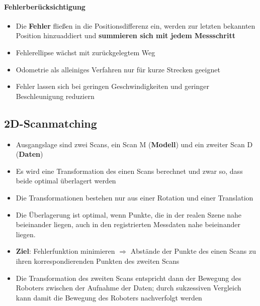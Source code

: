 \paragraph{Fehlerberücksichtigung}
\begin{itemize}
	\item Die \textbf{Fehler} fließen in die Positionsdifferenz ein, werden zur
		letzten bekannten Position hinzuaddiert und \textbf{summieren sich mit
		jedem Messschritt}
	\item Fehlerellipse wächst mit zurückgelegtem Weg
	\item Odometrie als alleiniges Verfahren nur für kurze Strecken geeignet
	\item Fehler lassen sich bei geringen Geschwindigkeiten und geringer
		Beschleunigung reduziern
\end{itemize}

\subsection{2D-Scanmatching}
\begin{itemize}
	\item Ausgangslage sind zwei Scans, ein Scan M (\textbf{Modell}) und ein
		zweiter Scan D (\textbf{Daten})
	\item Es wird eine Transformation des einen Scans berechnet und zwar so,
		dass beide optimal überlagert werden
	\item Die Transformationen bestehen nur aus einer Rotation und einer
		Translation
	\item Die Überlagerung ist optimal, wenn Punkte, die in der realen Szene
		nahe beieinander liegen, auch in den registrierten Messdaten nahe
		beieinander liegen.
	\item \textbf{Ziel}: Fehlerfunktion minimieren $\Rightarrow$ Abstände der
		Punkte des einen Scans zu ihren korrespondierenden Punkten des zweiten
		Scans
	\item Die Transformation des zweiten Scans entspricht dann der Bewegung des
		Roboters zwischen der Aufnahme der Daten; durch sukzessiven Vergleich kann
		damit die Bewegung des Roboters nachverfolgt werden
\end{itemize}

